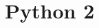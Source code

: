 \documentclass[../Languages.tex]{subfiles}
\begin{document}
\section{Python 2}\label{sec:python_2}

\newpage
\end{document}
